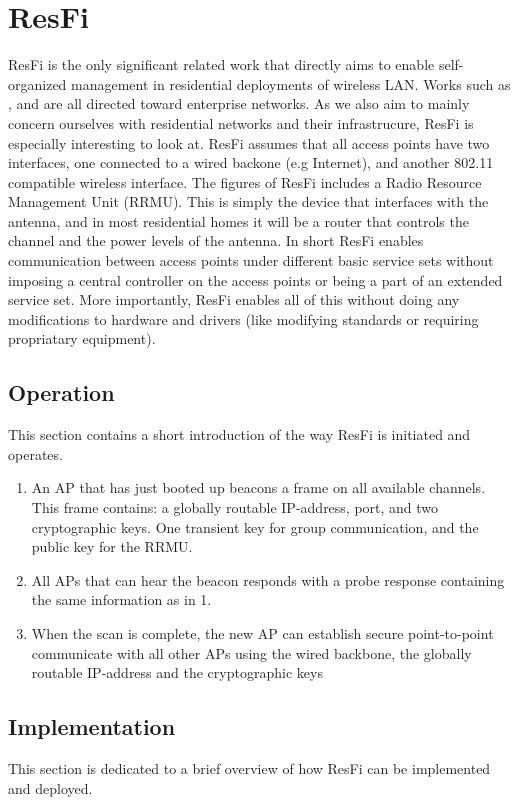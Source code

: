 \section{ResFi}
ResFi \cite{resfi} is the only significant related work that directly aims to enable self-organized management in residential deployments of wireless LAN. Works such as \cite{Murty2}, \cite{ciscoRRM} and \cite{Aerohive} are all directed toward enterprise
networks. As we also aim to mainly concern ourselves with residential networks and their infrastrucure, ResFi is especially interesting to look at. ResFi assumes that all access points have two interfaces, one connected to a wired backone (e.g Internet), and another
802.11 compatible wireless interface. The figures of ResFi includes a Radio Resource Management Unit (RRMU). This is simply the device that interfaces with the antenna, and in most residential homes it will be a router that controls the channel and the power levels of the antenna. In short ResFi enables communication between access points under different basic service sets without imposing a central controller on the access points or being a part of an extended service set. More importantly, ResFi enables all of this without doing any modifications to hardware and drivers (like modifying standards or requiring propriatary equipment). 

\subsection{Operation}
This section contains a short introduction of the way ResFi is initiated and operates.
\begin{enumerate}
	\item An AP that has just booted up beacons a frame on all available channels. This frame contains: a globally routable IP-address, port, and two cryptographic keys. One transient key for group communication, and the public key for the RRMU. 
	\item All APs that can hear the beacon responds with a probe response containing the same information as in 1.
	\item When the scan is complete, the new AP can establish secure point-to-point communicate with all other APs using the wired backbone, the globally routable IP-address and the cryptographic keys
\end{enumerate}

\subsection{Implementation}
This section is dedicated to a brief overview of how ResFi can be implemented and deployed.

